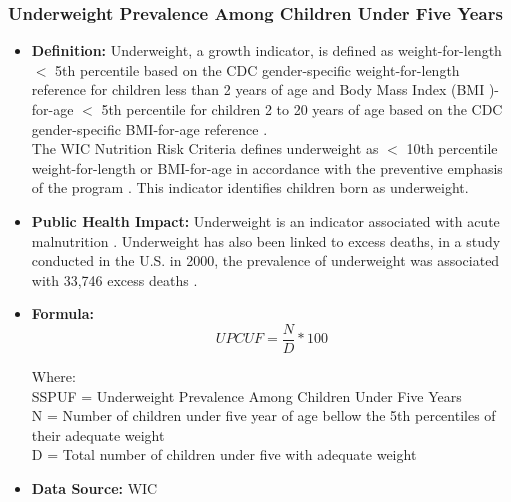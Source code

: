 \documentclass[12pt,letterpaper]{report}
\begin{document}
	\subsubsection{Underweight Prevalence Among Children Under Five Years} 
	\begin{itemize}
		\item \textbf{Definition:} Underweight, a growth indicator, is defined as weight-for-length $<$ 5th percentile based on the CDC gender-specific weight-for-length reference for children less than 2 years of age and Body Mass Index (BMI )-for-age $<$ 5th percentile for children 2 to 20 years of age based on the CDC gender-specific BMI-for-age reference \cite{mei1998increasing}. \\
		The WIC Nutrition Risk Criteria defines underweight as $<$ 10th percentile weight-for-length or BMI-for-age in accordance with the preventive emphasis of the program \cite{national1996WIC}. This indicator identifies children born as underweight.
		
		\item \textbf{Public Health Impact:} Underweight is an indicator associated with acute malnutrition \cite{martorell1999nature}. Underweight has also been linked to excess deaths, in a study conducted in the U.S. in 2000, the prevalence of underweight was associated with 33,746 excess deaths \cite{flegal2005excess}.
		
	\item \textbf{Formula:} 
			\begin{equation} 
		UPCUF = \frac{N}{D} *100	
			\end{equation} 

Where: \\
	SSPUF = Underweight Prevalence Among Children Under Five Years\\
			
			N = Number of children under five year of age bellow the 5th percentiles of their adequate weight\\
			
			D = Total number of children under five with adequate weight\\
		
		\item \textbf{Data Source:} WIC
	\end{itemize}

\end{document}
